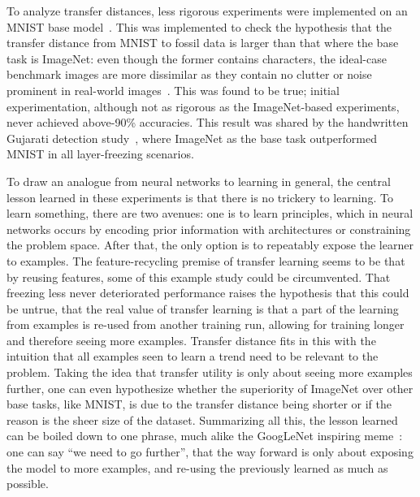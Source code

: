 \documentclass[english,twoside,openright]{UH_DS_MSc}
\begin{document}
To analyze transfer distances, less rigorous experiments were implemented on an MNIST base model~\cite{jamilemnist}.
This was implemented to check the hypothesis that the transfer distance from MNIST to fossil data is larger than that where 
the base task is ImageNet: even though the former contains characters, the ideal-case benchmark images are more dissimilar 
as they contain no clutter or noise prominent in real-world images~\cite{alexnet}. This was found to be true; 
initial experimentation, although not as rigorous as the ImageNet-based experiments, never achieved above-90\% accuracies.
This result was shared by the handwritten Gujarati detection study~\cite{8goelGujarati2023}, where ImageNet as the base task 
outperformed MNIST in all layer-freezing scenarios. 

To draw an analogue from neural networks to learning in general, the central lesson learned in these experiments 
is that there is no trickery to learning. To learn something, there are two avenues: one is to learn principles, which in 
neural networks occurs by encoding prior information with architectures or constraining the problem space. After that, the only 
option is to repeatably expose the learner to examples. The feature-recycling premise of transfer learning seems to be that 
by reusing features, some of this example study could be circumvented. That freezing less never deteriorated performance
raises the hypothesis that this could be untrue, that the real value of transfer learning is that a part of the learning from 
examples is re-used from another training run, allowing for training longer and therefore seeing more examples. Transfer distance 
fits in this with the intuition that all examples seen to learn a trend need to be relevant to the problem. 
Taking the idea that transfer utility is only about 
seeing more examples further, one can even hypothesize whether the superiority of ImageNet over other base tasks, like MNIST, is 
due to the transfer distance being shorter or if the reason is the sheer size of the dataset. Summarizing all this, the lesson learned
can be boiled down to one phrase, much alike the GoogLeNet inspiring meme~\cite{we_need_to_go_deeper}: one can say ``we need to go further'', that the way forward is only about exposing the model to more examples, 
and re-using the previously learned as much as possible.
\end{document}
